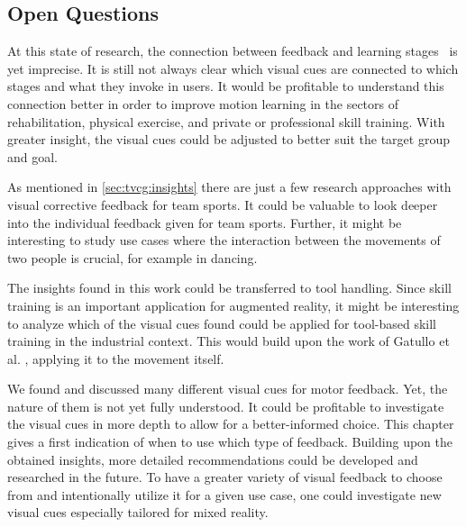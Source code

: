 \subsection{Open Questions \label{sec:futureWork}}
At this state of research, the connection between feedback and learning stages~\cite{fitts1967HPe} is yet imprecise. It is still not always clear which visual cues are connected to which stages and what they invoke in users. It would be profitable to understand this connection better in order to improve motion learning in the sectors of rehabilitation, physical exercise, and private or professional skill training. With greater insight, the visual cues could be adjusted to better suit the target group and goal.

As mentioned in \autoref{sec:tvcg:insights} there are just a few research approaches with visual corrective feedback for team sports. It could be valuable to look deeper into the individual feedback given for team sports. Further, it might be interesting to study use cases where the interaction between the movements of two people is crucial, for example in dancing.

The insights found in this work could be transferred to tool handling. Since skill training is an important application for augmented reality, it might be interesting to analyze which of the visual cues found could be applied for tool-based skill training in the industrial context. This would build upon the work of Gatullo et al. \cite{gatullo2020whw}, applying it to the movement itself.

We found and discussed many different visual cues for motor feedback. Yet, the nature of them is not yet fully understood. It could be profitable to investigate the visual cues in more depth to allow for a better-informed choice. This chapter gives a first indication of when to use which type of feedback. Building upon the obtained insights, more detailed recommendations could be developed and researched in the future. To have a greater variety of visual feedback to choose from and intentionally utilize it for a given use case, one could investigate new visual cues especially tailored for mixed reality.


